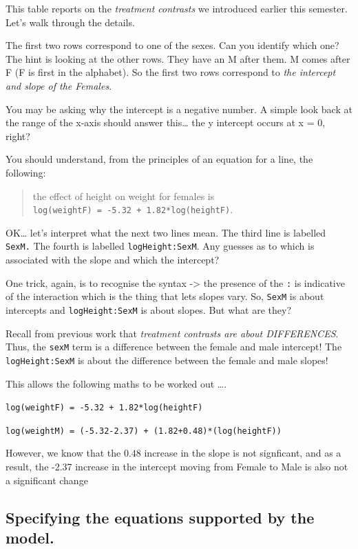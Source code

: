\documentclass[
]{book}
\begin{document}
This table reports on the \emph{treatment contrasts} we introduced earlier this semester. Let's walk through the details.

The first two rows correspond to one of the sexes. Can you identify which one? The hint is looking at the other rows. They have an M after them. M comes after F (F is first in the alphabet). So the first two rows correspond to \emph{the intercept and slope of the Females}.

You may be asking why the intercept is a negative number. A simple look back at the range of the x-axis should answer this\ldots{} the y intercept occurs at x = 0, right?

You should understand, from the principles of an equation for a line, the following:

\begin{quote}
the effect of height on weight for females is \texttt{log(weightF)\ =\ -5.32\ +\ 1.82*log(heightF)}.
\end{quote}

OK\ldots{} let's interpret what the next two lines mean. The third line is labelled \texttt{SexM.} The fourth is labelled \texttt{logHeight:SexM}. Any guesses as to which is associated with the slope and which the intercept?

One trick, again, is to recognise the syntax -\textgreater{} the presence of the \texttt{:} is indicative of the interaction which is the thing that lets slopes vary. So, \texttt{SexM} is about intercepts and \texttt{logHeight:SexM} is about slopes. But what are they?

Recall from previous work that \emph{treatment contrasts are about DIFFERENCES}. Thus, the \texttt{sexM} term is a difference between the female and male intercept! The \texttt{logHeight:SexM} is about the difference between the female and male slopes!

This allows the following maths to be worked out \ldots.

\texttt{log(weightF)\ =\ -5.32\ +\ 1.82*log(heightF)}

\texttt{log(weightM)\ =\ (-5.32-2.37)\ +\ (1.82+0.48)*(log(heightF))}

However, we know that the \(0.48\) increase in the slope is not signficant, and as a result, the -2.37 increase in the intercept moving from Female to Male is also not a significant change

\subsection{Specifying the equations supported by the model.}\label{specifying-the-equations-supported-by-the-model.}
\end{document}
